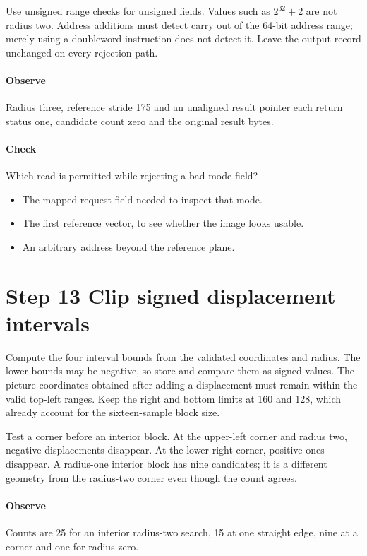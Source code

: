 Use unsigned range checks for unsigned fields. Values such as
$2^{32}+2$ are not radius two. Address additions must detect carry out of the
64-bit address range; merely using a doubleword instruction does not detect it.
Leave the output record unchanged on every rejection path.

\paragraph{Observe} Radius three, reference stride 175 and an unaligned result
pointer each return status one, candidate count zero and the original result bytes.
\paragraph{Check} Which read is permitted while rejecting a bad mode field?
\begin{itemize}
  \item[A.] The mapped request field needed to inspect that mode.
  \item[B.] The first reference vector, to see whether the image looks usable.
  \item[C.] An arbitrary address beyond the reference plane.
\end{itemize}

\section{Step 13 Clip signed displacement intervals}\label{h263-motion-s03}
Compute the four interval bounds from the validated coordinates and radius.
The lower bounds may be negative, so store and compare them as signed values.
The picture coordinates obtained after adding a displacement must remain within
the valid top-left ranges. Keep the right and bottom limits at 160 and 128,
which already account for the sixteen-sample block size.

Test a corner before an interior block. At the upper-left corner and radius two,
negative displacements disappear. At the lower-right corner, positive ones
disappear. A radius-one interior block has nine candidates; it is a different
geometry from the radius-two corner even though the count agrees.

\paragraph{Observe} Counts are 25 for an interior radius-two search, 15 at one
straight edge, nine at a corner and one for radius zero.
